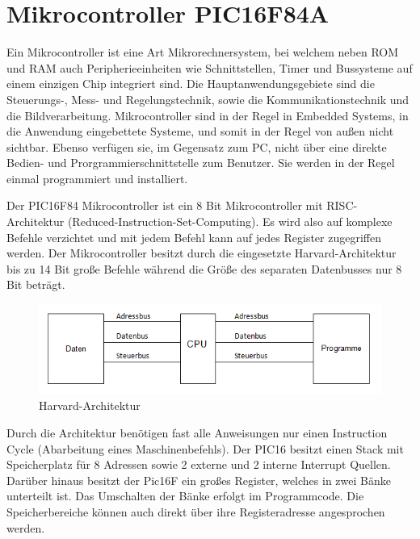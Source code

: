\section{Mikrocontroller PIC16F84A}

Ein Mikrocontroller ist eine Art Mikrorechnersystem, bei welchem neben ROM und RAM auch Peripherieeinheiten wie Schnittstellen, Timer und Bussysteme auf einem einzigen Chip integriert sind.
Die Hauptanwendungsgebiete sind die Steuerungs-, Mess- und Regelungstechnik, sowie die Kommunikationstechnik und die Bildverarbeitung. Mikrocontroller sind in der Regel in Embedded Systems, in die Anwendung eingebettete Systeme, und somit in der Regel von au\ss en nicht sichtbar. Ebenso verf\"ugen sie, im Gegensatz zum PC, nicht \"uber eine direkte Bedien- und Prorgrammierschnittstelle zum Benutzer. Sie werden in der Regel einmal programmiert und installiert.

Der PIC16F84 Mikrocontroller ist ein 8 Bit Mikrocontroller mit RISC-Architektur (Reduced-Instruction-Set-Computing). Es wird also auf komplexe Befehle verzichtet und mit jedem Befehl kann auf jedes Register zugegriffen werden. Der Mikrocontroller besitzt durch die eingesetzte Harvard-Architektur bis zu 14 Bit gro\ss e Befehle w\"ahrend die Gr\"o\ss e des separaten Datenbusses nur 8 Bit betr\"agt.

\begin{figure}[htb]
\centering
\includegraphics{Bilder/Harvard}
\caption{Harvard-Architektur}
\end{figure}

\newpage
Durch die Architektur ben\"otigen fast alle Anweisungen nur einen Instruction Cycle (Abarbeitung eines Maschinenbefehls).
Der PIC16 besitzt einen Stack mit Speicherplatz f\"ur 8 Adressen sowie 2 externe und 2 interne Interrupt Quellen. Dar\"uber hinaus besitzt der Pic16F ein gro\ss es Register, welches in zwei B\"anke unterteilt ist. Das Umschalten der B\"anke erfolgt im Programmcode. Die Speicherbereiche k\"onnen auch direkt \"uber ihre Registeradresse angesprochen werden.

